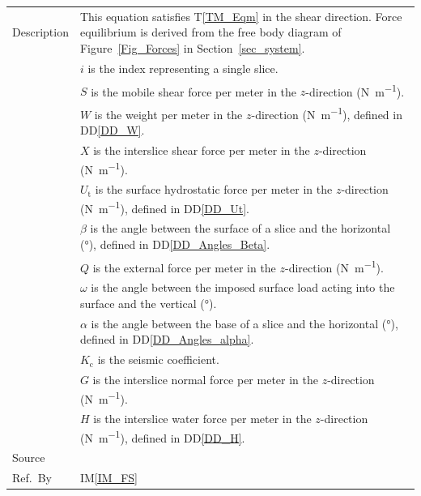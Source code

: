\documentclass[12pt]{article}
\newcommand{\colAwidth}{0.13\textwidth}
\newcommand{\colBwidth}{0.82\textwidth}
\newcommand{\tref}[1]{T\ref{#1}}
\newcommand{\iref}[1]{IM\ref{#1}}
\newcommand{\ddref}[1]{DD\ref{#1}}
\begin{document}
\begin{minipage}{\textwidth}
\begin{tabular}{| p{\colAwidth} | p{\colBwidth}|}
  \hline Description & This equation satisfies \tref{TM_Eqm} in the shear 
  direction. Force equilibrium is derived from the free body diagram of 
  Figure~\ref{Fig_Forces} in Section~\ref{sec_system}.\\
  &$i$ is the index representing a single slice.\\
  &$S$ is the mobile shear force per meter in the $z$-direction 
  (\si{\newton\per\meter}). \\
  &$W$ is the weight per meter in the $z$-direction (\si{\newton\per\meter}), 
  defined in \ddref{DD_W}. \\
  &$X$ is the interslice shear force per meter in the $z$-direction 
  (\si{\newton\per\meter}). \\
  &$U_\text{t}$ is the surface hydrostatic force per meter in the $z$-direction 
  (\si{\newton\per\meter}), 
  defined in \ddref{DD_Ut}. \\
  &$\beta$ is the angle between the surface of a slice and the 
  horizontal (\si{\degree}), defined in \ddref{DD_Angles_Beta}. \\
  &$Q$ is the external force per meter in the $z$-direction 
  (\si{\newton\per\meter}). \\
  &$\omega$ is the angle between the imposed surface load acting into 
  the surface and the vertical (\si{\degree}). \\
  &$\alpha$ is the angle between the base of a slice and the 
  horizontal (\si{\degree}), defined in \ddref{DD_Angles_alpha}. \\
  &$K_\text{c}$ is the seismic coefficient. \\
  &$G$ is the interslice normal force per meter in the $z$-direction 
  (\si{\newton\per\meter}). \\
  &$H$ is the interslice water force per meter in the $z$-direction 
  (\si{\newton\per\meter}), defined in 
  \ddref{DD_H}. \\

  \hline Source & \cite{ZhuEtAl2005}\\
  
  \hline Ref.\ By & \iref{IM_FS}\\
  
  \hline
\end{tabular}
\end{minipage}\\

~\newline
\end{document}
